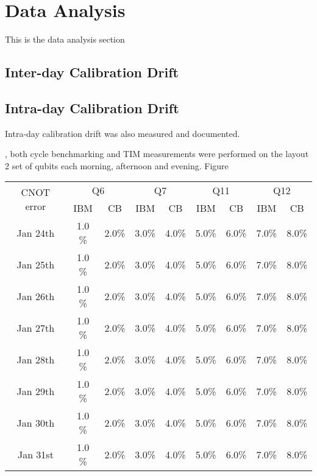 
\section{Data Analysis}
This is the data analysis section

\subsection{Inter-day Calibration Drift}

\subsection{Intra-day Calibration Drift}

Intra-day calibration drift was also measured and documented.  

, both cycle benchmarking and TIM measurements were performed on the layout 2 set of qubits each morning, afternoon and evening.  Figure 





\begin{table}
  \begin{tabular}{|c|c|c|c|c|c|c|c|c|}
    \hline
    \multirow{2}{*}{CNOT error} &
      \multicolumn{2}{|c}{Q6} &
      \multicolumn{2}{|c}{Q7} &
      \multicolumn{2}{|c}{Q11} &
      \multicolumn{2}{|c|}{Q12} \\
    & IBM & CB & IBM & CB & IBM & CB & IBM & CB \\
    \hline
    Jan 24th  & 1.0 \% & 2.0\% & 3.0\% & 4.0\% & 5.0\% & 6.0\% & 7.0\% & 8.0\%    \\
    \hline
    Jan 25th  & 1.0 \% & 2.0\% & 3.0\% & 4.0\% & 5.0\% & 6.0\% & 7.0\% & 8.0\%    \\
    \hline
    Jan 26th  & 1.0 \% & 2.0\% & 3.0\% & 4.0\% & 5.0\% & 6.0\% & 7.0\% & 8.0\%    \\
    \hline
    Jan 27th  & 1.0 \% & 2.0\% & 3.0\% & 4.0\% & 5.0\% & 6.0\% & 7.0\% & 8.0\%    \\
    \hline
    Jan 28th  & 1.0 \% & 2.0\% & 3.0\% & 4.0\% & 5.0\% & 6.0\% & 7.0\% & 8.0\%    \\
    \hline
    Jan 29th  & 1.0 \% & 2.0\% & 3.0\% & 4.0\% & 5.0\% & 6.0\% & 7.0\% & 8.0\%    \\
    \hline
     Jan 30th  & 1.0 \% & 2.0\% & 3.0\% & 4.0\% & 5.0\% & 6.0\% & 7.0\% & 8.0\%    \\
    \hline
    Jan 31st  & 1.0 \% & 2.0\% & 3.0\% & 4.0\% & 5.0\% & 6.0\% & 7.0\% & 8.0\%    \\
    \hline
  \end{tabular}
\end{table}
